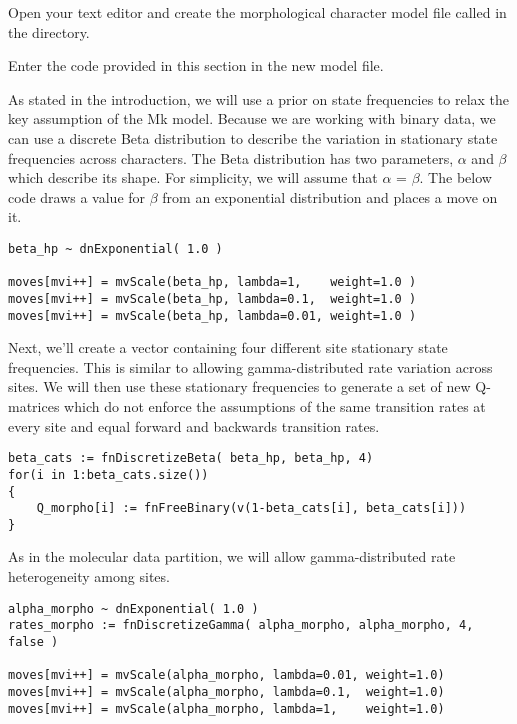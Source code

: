 {\begin{framed}
Open your text editor and create the morphological character model file called {\textcolor{red}{}} in the  directory.

Enter the \Rev code provided in this section in the new model file.
\end{framed}}

As stated in the introduction, we will use a prior on state frequencies to relax the key assumption of the Mk model. 
Because we are working with binary data, we can use a discrete Beta distribution to describe the variation in stationary state frequencies across characters. 
The Beta distribution has two parameters, $\alpha$ and $\beta$ which describe its shape. 
For simplicity, we will assume that $\alpha$ = $\beta$. 
The below code draws a value for $\beta$ from an exponential distribution and places a move on it.

{\tt \begin{snugshade*}
\begin{lstlisting}
beta_hp ~ dnExponential( 1.0 )

moves[mvi++] = mvScale(beta_hp, lambda=1,    weight=1.0 )
moves[mvi++] = mvScale(beta_hp, lambda=0.1,  weight=1.0 )
moves[mvi++] = mvScale(beta_hp, lambda=0.01, weight=1.0 )
\end{lstlisting}
\end{snugshade*}}

Next, we'll create a vector containing four different site stationary state frequencies. 
This is similar to allowing gamma-distributed rate variation across sites. 
We will then use these stationary frequencies to generate a set of new Q-matrices which do not enforce the assumptions of the same transition rates at every site and equal forward and backwards transition rates.

{\tt \begin{snugshade*}
\begin{lstlisting}
beta_cats := fnDiscretizeBeta( beta_hp, beta_hp, 4)
for(i in 1:beta_cats.size())
{
    Q_morpho[i] := fnFreeBinary(v(1-beta_cats[i], beta_cats[i]))
}
\end{lstlisting}
\end{snugshade*}}


As in the molecular data partition, we will allow gamma-distributed rate heterogeneity among sites.
{\tt \begin{snugshade*}
\begin{lstlisting}
alpha_morpho ~ dnExponential( 1.0 )
rates_morpho := fnDiscretizeGamma( alpha_morpho, alpha_morpho, 4, false )

moves[mvi++] = mvScale(alpha_morpho, lambda=0.01, weight=1.0)
moves[mvi++] = mvScale(alpha_morpho, lambda=0.1,  weight=1.0)
moves[mvi++] = mvScale(alpha_morpho, lambda=1,    weight=1.0)
\end{lstlisting}
\end{snugshade*}}


